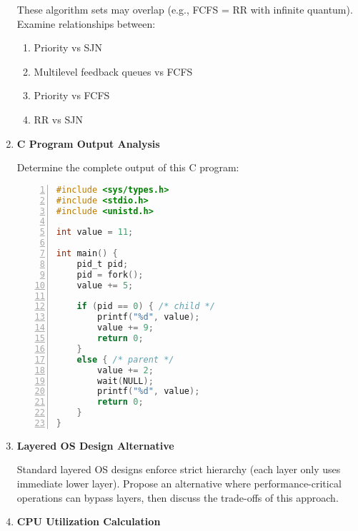 \documentclass[12pt]{article}
\begin{document}
\begin{enumerate}[leftmargin=*]
    These algorithm sets may overlap (e.g., FCFS = RR with infinite quantum). Examine relationships between:
    \begin{enumerate}[label=(\alph*)]
        \item Priority vs SJN
        \item Multilevel feedback queues vs FCFS
        \item Priority vs FCFS
        \item RR vs SJN
    \end{enumerate}
    


    
    \item \textbf{C Program Output Analysis}
    
    Determine the complete output of this C program:
    \newpage
    \begin{lstlisting}[language=C, basicstyle=\ttfamily\footnotesize, numbers=left]
#include <sys/types.h>
#include <stdio.h>
#include <unistd.h>

int value = 11;

int main() {
    pid_t pid;
    pid = fork();
    value += 5;
    
    if (pid == 0) { /* child */
        printf("%d", value);
        value += 9;
        return 0;
    }
    else { /* parent */
        value += 2;
        wait(NULL);
        printf("%d", value);
        return 0;
    }
}
    \end{lstlisting}
    
    

    \item \textbf{Layered OS Design Alternative}
    
    Standard layered OS designs enforce strict hierarchy (each layer only uses immediate lower layer). Propose an alternative where performance-critical operations can bypass layers, then discuss the trade-offs of this approach.
    

    \item \textbf{CPU Utilization Calculation}
    

\end{enumerate}
\end{document}
